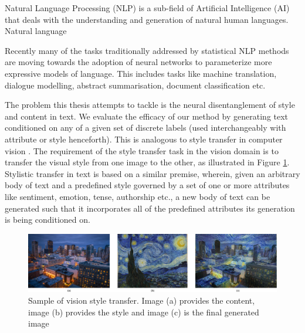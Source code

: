 Natural Language Processing (NLP) is a sub-field of Artificial Intelligence (AI) that deals with the understanding and generation of natural human languages. Natural language

Recently many of the tasks traditionally addressed by statistical NLP methods are moving towards the adoption of neural networks to parameterize more expressive models of language. This includes tasks like machine translation, dialogue modelling, abstract summarisation, document classification etc.

The problem this thesis attempts to tackle is the neural disentanglement of style and content in text. We evaluate the efficacy of our method by generating text conditioned on any of a given set of discrete labels (used interchangeably with attribute or style henceforth). This is analogous to style transfer in computer vision \citep{gatys2016image}. The requirement of the style transfer task in the vision domain is to transfer the visual style from one image to the other, as illustrated in Figure \ref{fig:style-transfer-vision}. Stylistic transfer in text is based on a similar premise, wherein, given an arbitrary body of text and a predefined style governed by a set of one or more attributes like sentiment, emotion, tense, authorship etc., a new body of text can be generated such that it incorporates all of the predefined attributes its generation is being conditioned on.

\begin{figure}[ht]
	\centering
	\includegraphics[width=\textwidth]{images/style-transfer-vision.png}
	\caption{\label{fig:style-transfer-vision}Sample of vision style transfer. Image (a) provides the content, image (b) provides the style and image (c) is the final generated image}
\end{figure}


